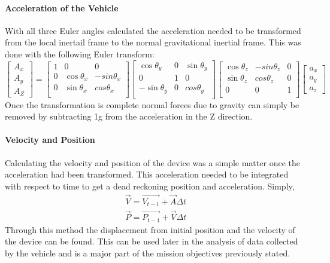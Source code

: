 \documentclass{report}
\begin{document}
\paragraph{Acceleration of the Vehicle} With all three Euler angles calculated the acceleration needed to be transformed from the local inertail frame to the normal gravitational inertial frame. This was done with the following Euler transform:
\begin{equation}
\begin{bmatrix}
A_x\\A_y\\A_Z
\end{bmatrix}
=
\begin{bmatrix}
1&0&0\\
0&\cos{\theta_x}&-sin{\theta_x}\\
0&\sin{\theta_x}&cos{\theta_x}\\
\end{bmatrix}
\begin{bmatrix}
\cos{\theta_y}&0&\sin{\theta_y}\\
0&1&0\\
-\sin{\theta_y}&0&cos{\theta_y}\\
\end{bmatrix}
\begin{bmatrix}
\cos{\theta_z}&-sin{\theta_z}&0\\
\sin{\theta_z}&cos{\theta_z}&0\\
0&0&1\\
\end{bmatrix}
\begin{bmatrix}
a_x\\a_y\\a_z
\end{bmatrix}
\end{equation}
Once the transformation is complete normal forces due to gravity can simply be removed by subtracting 1g from the acceleration in the Z direction.
\paragraph{Velocity and Position}
Calculating the velocity and position of the device was a simple matter once the acceleration had been transformed. This acceleration needed to be integrated with respect to time to get a dead reckoning position and acceleration. Simply,
\begin{equation}
\begin{split}
\vec{V}=\vec{V_{t-1}}+\vec{A}\Delta t \\
\vec{P}=\vec{P_{t-1}}+\vec{V}\Delta t
\end{split}
\end{equation}
Through this method the displacement from initial position and the velocity of the device can be found. This can be used later in the analysis of data collected by the vehicle and is a major part of the mission objectives previously stated.
\end{document}
